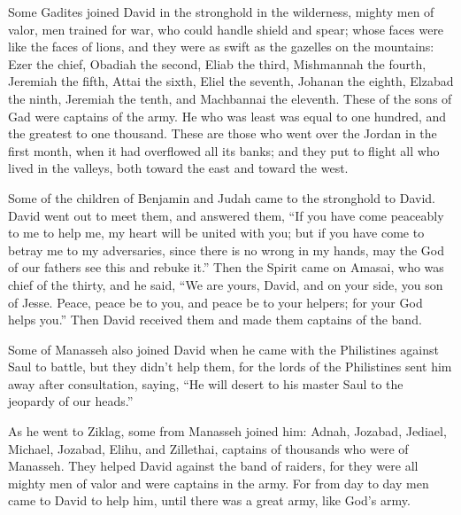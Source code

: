  Some Gadites joined David in the stronghold in the
wilderness, mighty men of valor, men trained for war, who could handle
shield and spear; whose faces were like the faces of lions, and they
were as swift as the gazelles on the mountains:  Ezer the
chief, Obadiah the second, Eliab the third,  Mishmannah
the fourth, Jeremiah the fifth,  Attai the sixth, Eliel
the seventh,  Johanan the eighth, Elzabad the ninth,
 Jeremiah the tenth, and Machbannai the eleventh.
 These of the sons of Gad were captains of the army. He
who was least was equal to one hundred, and the greatest to one
thousand.  These are those who went over the Jordan in
the first month, when it had overflowed all its banks; and they put to
flight all who lived in the valleys, both toward the east and toward the
west.

 Some of the children of Benjamin and Judah came to the
stronghold to David.  David went out to meet them, and
answered them, ``If you have come peaceably to me to help me, my heart
will be united with you; but if you have come to betray me to my
adversaries, since there is no wrong in my hands, may the God of our
fathers see this and rebuke it.''  Then the Spirit came
on Amasai, who was chief of the thirty, and he said, ``We are yours,
David, and on your side, you son of Jesse. Peace, peace be to you, and
peace be to your helpers; for your God helps you.'' Then David received
them and made them captains of the band.

 Some of Manasseh also joined David when he came with the
Philistines against Saul to battle, but they didn't help them, for the
lords of the Philistines sent him away after consultation, saying, ``He
will desert to his master Saul to the jeopardy of our heads.''

 As he went to Ziklag, some from Manasseh joined him:
Adnah, Jozabad, Jediael, Michael, Jozabad, Elihu, and Zillethai,
captains of thousands who were of Manasseh.  They helped
David against the band of raiders, for they were all mighty men of valor
and were captains in the army.  For from day to day men
came to David to help him, until there was a great army, like God's
army.

